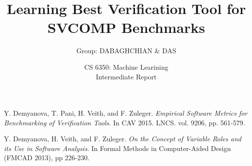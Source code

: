 \documentclass[11pt, fullpage,letterpaper]{article}
\title{Learning Best Verification Tool for SVCOMP Benchmarks}
\date{CS 6350: Machine Learining \semester\\Intermediate Report}
\author{Group: DABAGHCHIAN \& DAS}
\begin{document}
\maketitle

\pagebreak
{}












\begin{thebibliography}{9}
Y. Demyanova, T. Pani, H. Veith, and F. Zuleger.
\textit{Empirical Software Metrics for Benchmarking of Verification Tools}. 
In CAV 2015. LNCS. vol. 9206, pp. 561-579.

Y. Demyanova, H. Veith, and F. Zuleger.
\textit{On the Concept of Variable Roles and its Use in Software Analysis}.
In Formal Methods in Computer-Aided Design (FMCAD 2013), pp 226-230.
\end{thebibliography}
\end{document}
